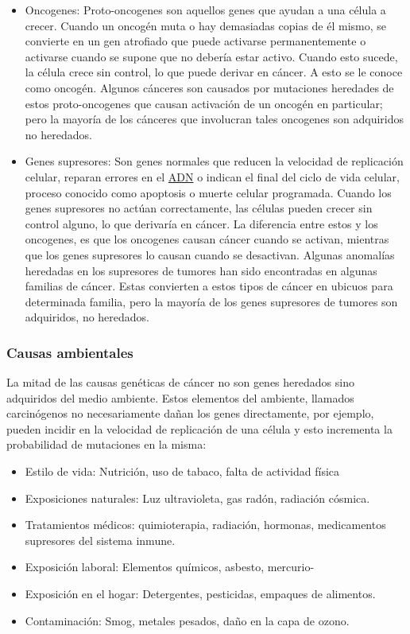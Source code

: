 \begin{itemize}
    \item{Oncogenes}: Proto-oncogenes son aquellos genes que ayudan a una célula
    a crecer. Cuando un oncogén muta o hay demasiadas copias de él mismo, se
    convierte en un gen atrofiado que puede activarse permanentemente o
    activarse cuando se supone que no debería estar activo. Cuando esto sucede,
    la célula crece sin control, lo que puede derivar en cáncer. A esto se le
    conoce como oncogén. Algunos cánceres son causados por mutaciones heredades
    de estos proto-oncogenes que causan activación de un oncogén en particular;
    pero la mayoría de los cánceres que involucran tales oncogenes son
    adquiridos no heredados.
    \item{Genes supresores}: Son genes normales que reducen la velocidad de
    replicación celular, reparan errores en el \hyperlink{abbr}{ADN} o indican el final del ciclo
    de vida celular, proceso conocido como apoptosis o muerte celular
    programada. Cuando los genes supresores no actúan correctamente, las células
    pueden crecer sin control alguno, lo que derivaría en cáncer. La diferencia
    entre estos y los oncogenes, es que los oncogenes causan cáncer cuando se
    activan, mientras que los genes supresores lo causan cuando se desactivan.
    Algunas anomalías heredadas en los supresores de tumores han sido
    encontradas en algunas familias de cáncer. Estas convierten a estos tipos de
    cáncer en ubicuos para determinada familia, pero la mayoría de los genes
    supresores de tumores son adquiridos, no heredados.
\end{itemize}

\subsubsection{Causas ambientales}

La mitad de las causas genéticas de cáncer no son genes heredados sino
adquiridos del medio ambiente. Estos elementos del ambiente, llamados
carcinógenos no necesariamente dañan los genes directamente, por ejemplo, pueden
incidir en la velocidad de replicación de una célula y esto incrementa la
probabilidad de mutaciones en la misma:

\begin{minipage}{\textwidth}
\begin{itemize}
    \item{Estilo de vida}: Nutrición, uso de tabaco, falta de actividad física
    \item{Exposiciones naturales}: Luz ultravioleta, gas radón, radiación
    cósmica.
    \item{Tratamientos médicos}: quimioterapia, radiación, hormonas,
    medicamentos supresores del sistema inmune.
    \item{Exposición laboral}: Elementos químicos, asbesto, mercurio-
    \item{Exposición en el hogar}: Detergentes, pesticidas, empaques de
    alimentos.
    \item{Contaminación}: Smog, metales pesados, daño en la capa de ozono.     
\end{itemize}
\end{minipage}

